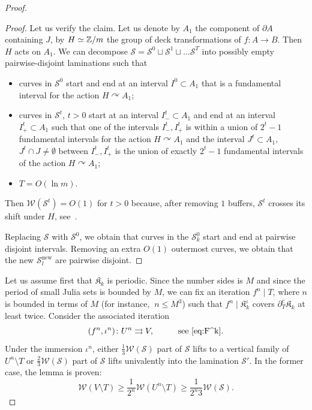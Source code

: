 \documentclass{amsart}
\newcommand{\filled}{{\mathfrak K }}
\newcommand{\1}{{\mathbb 1 }}
\newcommand{\FamS}{{\mathcal S}}
\newcommand{\Width}{{\mathcal W}}
\newcommand\new{{\operatorname{new}}}
\newcommand{\rrto}{\rightrightarrows}
\begin{document}
\begin{proof}
\begin{proof}
Let us verify the claim. Let us denote by $A_1$ the component of $\partial A$ containing $J$, by $H\simeq {\Bbb Z}/m$ the  group of deck transformations of $f\colon A\to B$. Then $H$ acts on $A_1$. We can decompose $\FamS=\FamS^0\sqcup \FamS^1\sqcup \dots \FamS^T$ into possibly empty pairwise-disjoint laminations such that
\begin{itemize}
\item curves in $\FamS^0$ start and end at an interval $I^0\subset  A_1$ that is a fundamental interval for the action $H\curvearrowright
 A_1$; 
\item curves in $\FamS^t$, $t>0$ start at an interval $I^t_- \subset  A_1$ and end at an interval $I^t_+\subset  A_1 $ such that one of the intervals $I^t_-, I^t_+$ is within a union of $2^t-1$ fundamental intervals for the action $H\curvearrowright
 A_1$ and the interval $J^t\subset A_1,$ $ J^t\cap J\not=\emptyset $ between $I^t_-,I^t_+$ is the union of exactly $2^t-1$ fundamental intervals of the action $H\curvearrowright
 A_1$;
\item $T= O(\ln m)$.
\end{itemize}
Then $\Width(\FamS^t)=O(1)$ for $t>0$ because, after removing $1$ buffers, $\FamS^t$ crosses its shift under $H$, see~\cite[Shift Argument \S A.3]{DL2}. 

Replacing $\FamS$ with $\FamS^0$, we obtain that curves in the $\FamS^{0}_k$ start and end at pairwise disjoint intervals. Removing an extra $O(1)$ outermost curves, we obtain that the new $\FamS^\new_l$ are pairwise disjoint.
\end{proof}


Let us assume first that $\filled_k$ is periodic. Since the number sides is $M$ and since the period of small Julia sets is bounded by $M$, we can fix an iteration $f^n\mid T$, where $n$ is bounded in terms of $M$ (for instance, $\  n\le M^3$) such that $f^n\mid \filled_k^\iota$ covers $\partial^c_T \filled_k$ at least twice. Consider the associated iteration \[(f^n,\iota^n)\colon U^n\rrto V,\hspace{1cm}\text{see~\eqref{eq:F^k}}.\] Under the immersion $\iota^n$, either $\frac 1 3 \Width(\FamS)$ part of $\FamS$ lifts to a vertical family of $U^n\setminus T$ or $\frac 2 3 \Width(\FamS)$ part of $\FamS$ lifts univalently into the lamination $\FamS'$. In the former case, the lemma is proven: 
\begin{equation}
\label{eq:lem:Wave:prf}
\Width(V\setminus T)\ge \frac{1}{2^n}\Width(U^n\setminus T)\ge  \frac{1}{2^n 3}\Width(\FamS).
\end{equation}




\end{proof}
\end{document}
